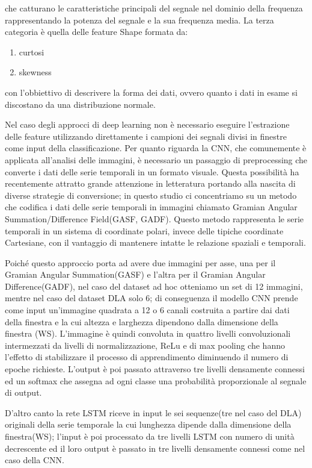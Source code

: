 che catturano le caratteristiche principali del segnale nel dominio della frequenza rappresentando la potenza del segnale e la sua frequenza media. La terza categoria è quella delle feature Shape formata da:

\begin{enumerate}
    \item curtosi 
    \item skewness
\end{enumerate}

con l'obbiettivo di descrivere la forma dei dati, ovvero quanto i dati in esame si discostano da una distribuzione normale.

Nel caso degli approcci di deep learning non è necessario eseguire l'estrazione delle feature utilizzando direttamente i campioni dei segnali divisi in finestre come input della classificazione. Per quanto riguarda la CNN, che comunemente è applicata all'analisi delle immagini, è necessario un passaggio di preprocessing che converte i dati delle serie temporali in un formato visuale. Questa possibilità ha recentemente attratto grande attenzione in letteratura portando alla nascita di diverse strategie di conversione; in questo studio ci concentriamo su un metodo che codifica i dati delle serie temporali in immagini chiamato Gramian Angular Summation/Difference Field(GASF, GADF)\cite{wang2015imaging}. Questo metodo rappresenta le serie temporali in un sistema di coordinate polari, invece delle tipiche coordinate Cartesiane, con il vantaggio di mantenere intatte le relazione spaziali e temporali. 

Poiché questo approccio porta ad avere due immagini per asse, una per il Gramian Angular Summation(GASF) e l'altra per il Gramian Angular Difference(GADF), nel caso del dataset ad hoc otteniamo un set di 12 immagini, mentre nel caso del dataset DLA solo 6; di conseguenza il modello CNN prende come input un'immagine quadrata a 12 o 6 canali costruita a partire dai dati della finestra e la cui altezza e larghezza dipendono dalla dimensione della finestra (WS). L'immagine è quindi convoluta in quattro livelli convoluzionali intermezzati da livelli di normalizzazione, ReLu e di max pooling che hanno l'effetto di stabilizzare il processo di apprendimento diminuendo il numero di epoche richieste. L'output è poi passato attraverso tre livelli densamente connessi ed un softmax che assegna ad ogni classe una probabilità proporzionale al segnale di output.

D'altro canto la rete LSTM riceve in input le sei sequenze(tre nel caso del DLA) originali della serie temporale la cui lunghezza dipende dalla dimensione della finestra(WS); l'input è poi processato da tre livelli LSTM con numero di unità decrescente ed il loro output è passato in tre livelli densamente connessi come nel caso della CNN.

